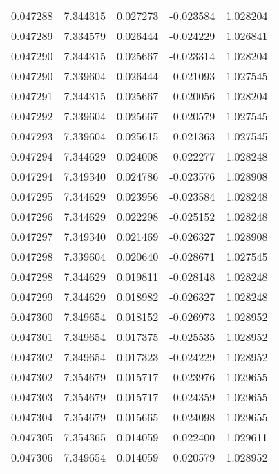 \begin{tabular}{lrrrr}
0.047288    &  7.344315 &  0.027273 & -0.023584 &             1.028204 \\
0.047289    &  7.334579 &  0.026444 & -0.024229 &             1.026841 \\
0.047290    &  7.344315 &  0.025667 & -0.023314 &             1.028204 \\
0.047290    &  7.339604 &  0.026444 & -0.021093 &             1.027545 \\
0.047291    &  7.344315 &  0.025667 & -0.020056 &             1.028204 \\
0.047292    &  7.339604 &  0.025667 & -0.020579 &             1.027545 \\
0.047293    &  7.339604 &  0.025615 & -0.021363 &             1.027545 \\
0.047294    &  7.344629 &  0.024008 & -0.022277 &             1.028248 \\
0.047294    &  7.349340 &  0.024786 & -0.023576 &             1.028908 \\
0.047295    &  7.344629 &  0.023956 & -0.023584 &             1.028248 \\
0.047296    &  7.344629 &  0.022298 & -0.025152 &             1.028248 \\
0.047297    &  7.349340 &  0.021469 & -0.026327 &             1.028908 \\
0.047298    &  7.339604 &  0.020640 & -0.028671 &             1.027545 \\
0.047298    &  7.344629 &  0.019811 & -0.028148 &             1.028248 \\
0.047299    &  7.344629 &  0.018982 & -0.026327 &             1.028248 \\
0.047300    &  7.349654 &  0.018152 & -0.026973 &             1.028952 \\
0.047301    &  7.349654 &  0.017375 & -0.025535 &             1.028952 \\
0.047302    &  7.349654 &  0.017323 & -0.024229 &             1.028952 \\
0.047302    &  7.354679 &  0.015717 & -0.023976 &             1.029655 \\
0.047303    &  7.354679 &  0.015717 & -0.024359 &             1.029655 \\
0.047304    &  7.354679 &  0.015665 & -0.024098 &             1.029655 \\
0.047305    &  7.354365 &  0.014059 & -0.022400 &             1.029611 \\
0.047306    &  7.349654 &  0.014059 & -0.020579 &             1.028952 \\

\end{tabular}
